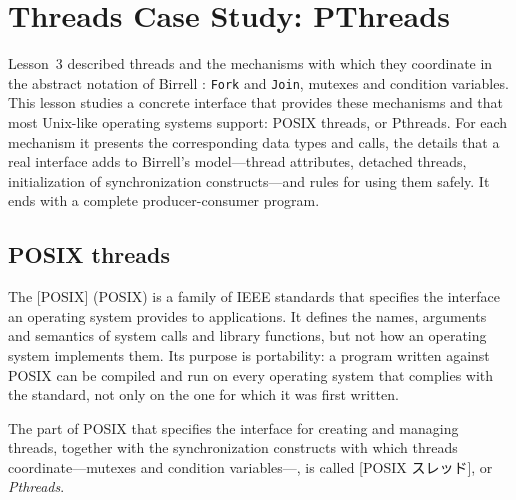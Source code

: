 \documentclass[../main.tex]{subfiles}
\begin{document}
\chapter{Threads Case Study: PThreads}

Lesson~3 described threads and the mechanisms with which they coordinate in
the abstract notation of Birrell \cite{birrell1989}: \texttt{Fork} and
\texttt{Join}, mutexes and condition variables.  This lesson studies a
concrete interface that provides these mechanisms and that most Unix-like
operating systems support: POSIX threads, or Pthreads.  For each mechanism
it presents the corresponding data types and calls, the details that a real
interface adds to Birrell's model---thread attributes, detached threads,
initialization of synchronization constructs---and rules for using them
safely.  It ends with a complete producer-consumer program.

\section{POSIX threads}
\label{sec:l04-posix}

The [POSIX]%
 (POSIX) is a family
of IEEE standards that specifies the interface an operating system provides
to applications.  It defines the names, arguments and semantics of system
calls and library functions, but not how an operating system implements
them.  Its purpose is portability: a program written against POSIX can be
compiled and run on every operating system that complies with the standard,
not only on the one for which it was first written.

\begin{definition}
  The part of POSIX that specifies the interface for creating and managing
  threads, together with the synchronization constructs with which threads
  coordinate---mutexes and condition variables---, is called
  [POSIX スレッド], or
  \emph{Pthreads}.
\end{definition}
\end{document}
